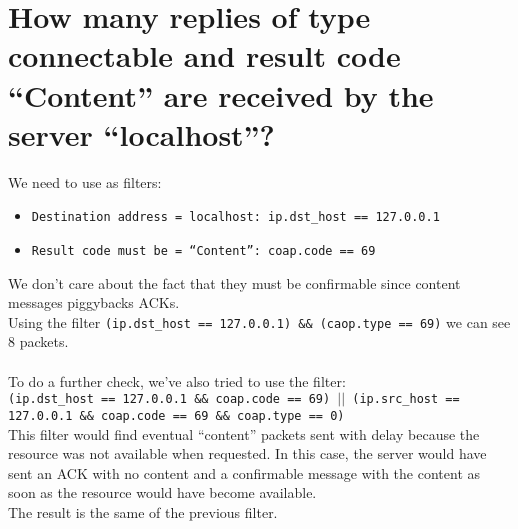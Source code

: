 \documentclass{article} %
\begin{document}
\section{\large{How many replies of type connectable and result code “Content” are received by the server “localhost”?}}
    We need to use as filters:
    \begin{itemize}
        \item \texttt{Destination address = localhost: ip.dst\_host == 127.0.0.1}
        \item \texttt{Result code must be = “Content”: coap.code == 69}
    \end{itemize}
    We don’t care about the fact that they must be confirmable since content messages piggybacks ACKs.\\
    Using the filter \texttt{(ip.dst\_host == 127.0.0.1) \&\& (caop.type == 69)} we can see 8 packets.\\ \\
    To do a further check, we’ve also tried to use the filter: \\
    \texttt{(ip.dst\_host == 127.0.0.1 \&\& coap.code == 69) $||$ (ip.src\_host == 127.0.0.1 \&\& coap.code == 69 \&\& coap.type == 0)} \\
    This filter would find eventual “content” packets sent with delay because the resource was not available when requested. 
    In this case, the server would have sent an ACK with no content and a confirmable message with the content as soon as the resource would have become available. \\
    The result is the same of the previous filter.

    
\end{document}
